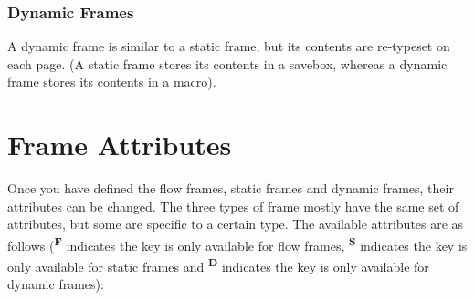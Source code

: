 \documentclass[a4paper]{article}\usepackage[]{graphicx}\usepackage[]{color}
\begin{document}
\subsubsection{Dynamic Frames}

A dynamic frame is similar to a static frame, but its contents
are re-typeset on each page. (A static frame stores its
contents in a savebox, whereas a dynamic frame stores its
contents in a macro).

\section{Frame Attributes}
\label{sec:modattr}

Once you have defined the {flow frames}, {static frames} and
{dynamic frames}, their attributes can be changed.
The three types of frame mostly have the
same set of attributes, but some are specific to a certain type.
The available attributes are as follows
(\textsuperscript{\textbf{F}} indicates the key is
only available for {flow frames},
\textsuperscript{\textbf{S}} indicates the key is only available
for {static frames}
and \textsuperscript{\textbf{D}} indicates the key
is only available for {dynamic frames}):
\end{document}

